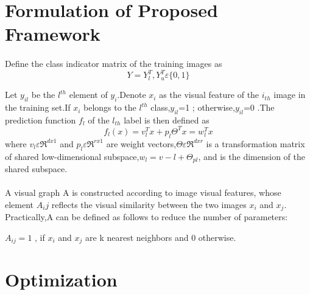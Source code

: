 \documentclass[a4paper,11pt]{report}
\begin{document}
\paragraph{}

\section{Formulation of Proposed Framework}
\paragraph{}Define the class indicator matrix of the training images as 
\begin{equation}
Y=Y_l^T,Y_u^T \varepsilon \{0,1\}
\end{equation}

Let $y_{il}$ be the $ l^{th}$ element of $y_i$.Denote $x_i$
as the visual feature of the $i_{th}$ image in the training set.If $x_i$
belongs to the $l^{th}$ class,$y_{il}$=1 ; otherwise,$y_{il}$=0 .The prediction function $f_l$ of the $l_{th}$ label is then defined as
\begin{equation}
f_l(x)= v_l^Tx + p_l\varTheta^Tx = w_l^Tx
\end{equation}
where $v_l\varepsilon\Re^{dx1}$ and $p_l\varepsilon\Re^{rx1}$ are weight vectors,$\Theta\varepsilon\Re^{dxr}$
is a transformation matrix of shared low-dimensional subspace,$w_l=v-l+\Theta_{pl}$, and is the dimension of the shared subspace.

\paragraph{}
A visual graph A is constructed according to
image visual features, whose element $A_ij$ reflects the visual
similarity between the two images $x_i$ and $x_j$.  Practically,A can be defined as follows to reduce the
number of parameters:


$A_{ij} =  1$ , if $x_i$ and $x_j$ are k nearest neighbors  and 0 otherwise.

\section{ Optimization}
\end{document}
